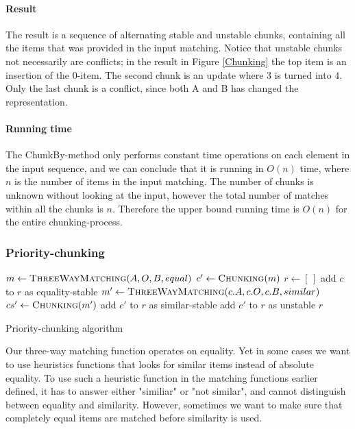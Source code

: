 \documentclass[11pt]{article}
\begin{document}

\paragraph{Result} The result is a sequence of alternating stable and unstable chunks, containing all the items that was provided in the input matching. Notice that unstable chunks not necessarily are conflicts; in the result in Figure \ref{Chunking} the top item is an insertion of the $0$-item. The second chunk is an update where $3$ is turned into $4$. Only the last chunk is a conflict, since both A and B has changed the representation. 

\paragraph{Running time} The ChunkBy-method only performs constant time operations on each element in the input sequence, and we can conclude that it is running in $O(n)$ time, where $n$ is the number of items in the input matching. The number of chunks is unknown without looking at the input, however the total number of matches within all the chunks is $n$. Therefore the upper bound running time is $O(n)$ for the entire chunking-process.

\subsubsection{Priority-chunking}
\label{PriorityDiff}

\begin{algorithm}
\begin{algorithmic}
	\State $m \gets \Call{ThreeWayMatching}{A, O, B, equal}$
	\State $c' \gets \Call{Chunking}{m}$
	\State $r \gets [\,]$
			\State add $c$ to $r$ as equality-stable
		\Else
			\State $m' \gets \Call{ThreeWayMatching}{c.A, c.O, c.B, similar} $
            \State $cs' \gets \Call{Chunking}{m'}$
					\State add $c'$ to $r$ as similar-stable
				\Else
					\State add $c'$ to $r$ as unstable
				\EndIf
			\EndFor
		\EndIf
	\EndFor
	\State \Return $r$
\EndFunction
\end{algorithmic}
	\caption{Priority-chunking algorithm}
	\label{PriorityChunk}
\end{algorithm}

Our three-way matching function operates on equality. Yet in some cases we want to use heuristics functions that looks for similar items instead of absolute equality. To use such a heuristic function in the matching functions earlier defined, it has to answer either "similiar" or "not similar", and cannot distinguish between equality and similarity. However, sometimes we want to make sure that completely equal items are matched before similarity is used.
\end{document}

